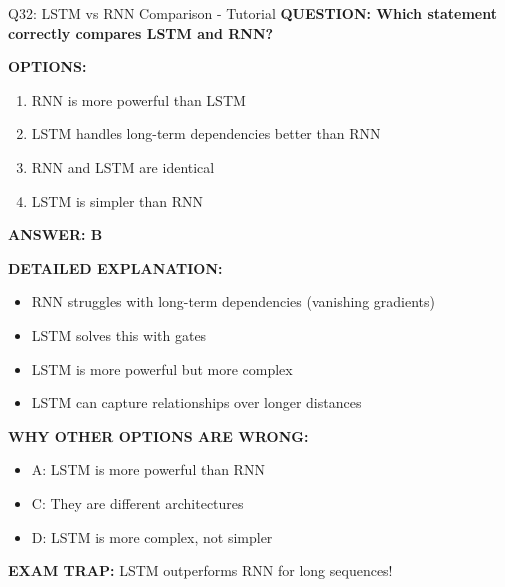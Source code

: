 \documentclass[8pt]{beamer}
\begin{document}
	\begin{frame}{Q32: LSTM vs RNN Comparison - Tutorial}
		\fontsize{6.5}{7.5}\selectfont
		\textbf{QUESTION: Which statement correctly compares LSTM and RNN?}
		
		\vspace{0.1cm}
		\textbf{OPTIONS:}
		\begin{enumerate}
			\item RNN is more powerful than LSTM
			\item LSTM handles long-term dependencies better than RNN
			\item RNN and LSTM are identical
			\item LSTM is simpler than RNN
		\end{enumerate}
		
		\vspace{0.1cm}
		\textcolor{myblue}{\textbf{ANSWER: B}}
		
		\vspace{0.1cm}
		\textbf{DETAILED EXPLANATION:}
		\begin{itemize}
			\item RNN struggles with long-term dependencies (vanishing gradients)
			\item LSTM solves this with gates
			\item LSTM is more powerful but more complex
			\item LSTM can capture relationships over longer distances
		\end{itemize}
		
		\vspace{0.1cm}
		\textcolor{myred}{\textbf{WHY OTHER OPTIONS ARE WRONG:}}
		\begin{itemize}
			\item \textcolor{myred}{A:} LSTM is more powerful than RNN
			\item \textcolor{myred}{C:} They are different architectures
			\item \textcolor{myred}{D:} LSTM is more complex, not simpler
		\end{itemize}
		
		\textcolor{myred}{\textbf{EXAM TRAP:}} LSTM \textcolor{myblue}{outperforms} RNN for long sequences!
	\end{frame}
	
\end{document}
